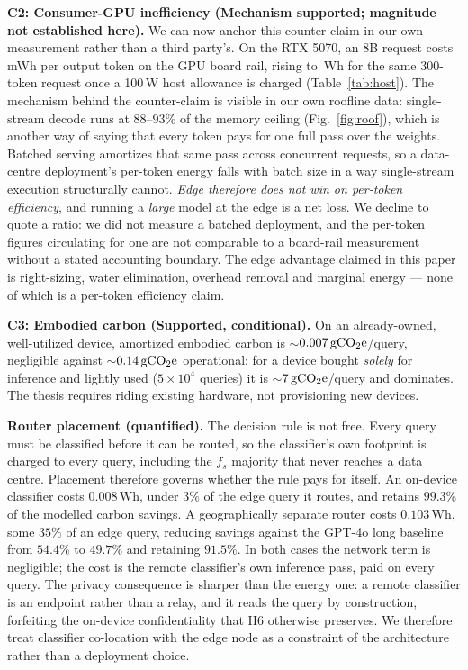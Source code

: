 \documentclass[conference]{IEEEtran}
\newcommand{\Wh}{\,\text{Wh}}
\newcommand{\gco}{\,\text{gCO\textsubscript{2}e}}
\newcommand{\fs}{f_{s}}
\begin{document}
\textbf{C2: Consumer-GPU inefficiency (Mechanism supported; magnitude not
established here).} We can now anchor this counter-claim in our own measurement
rather than a third party's. On the RTX 5070, an 8B request costs
\RtxEightMilliWh{}\,mWh per output token on the GPU board rail, rising to
\RtxEightHostHundred{}\,Wh for the same 300-token request once a 100\,W host
allowance is charged (Table~\ref{tab:host}). The mechanism behind the
counter-claim is visible in our own roofline data: single-stream decode runs at
$88$--$93\%$ of the memory ceiling (Fig.~\ref{fig:roof}), which is another way
of saying that every token pays for one full pass over the weights. Batched
serving amortizes that same pass across concurrent requests, so a data-centre
deployment's per-token energy falls with batch size in a way single-stream
execution structurally cannot. \emph{Edge therefore does not win on per-token
efficiency}, and running a \emph{large} model at the edge is a net loss. We
decline to quote a ratio: we did not measure a batched deployment, and the
per-token figures circulating for one are not comparable to a board-rail
measurement without a stated accounting boundary. The edge advantage claimed in
this paper is right-sizing, water elimination, overhead removal and marginal
energy --- none of which is a per-token efficiency claim.

\textbf{C3: Embodied carbon (Supported, conditional).} On an already-owned,
well-utilized device, amortized embodied carbon is $\sim$$0.007\gco$/query,
negligible against $\sim$$0.14\gco$ operational; for a device bought \emph{solely}
for inference and lightly used ($5{\times}10^4$ queries) it is $\sim$$7\gco$/query
and dominates. The thesis requires riding existing hardware, not provisioning new
devices.

\textbf{Router placement (quantified).} The decision rule is not free. Every
query must be classified before it can be routed, so the classifier's own
footprint is charged to every query, including the $\fs$ majority that never
reaches a data centre. Placement therefore governs whether the rule pays for
itself. An on-device classifier costs $0.008\Wh$, under $3\%$ of the edge query
it routes, and retains $99.3\%$ of the modelled carbon savings. A
geographically separate router costs $0.103\Wh$, some $35\%$ of an edge query,
reducing savings against the GPT-4o long baseline from $54.4\%$ to $49.7\%$ and
retaining $91.5\%$. In both cases the network term is negligible; the cost is
the remote classifier's own inference pass, paid on every query. The privacy
consequence is sharper than the energy one: a remote classifier is an endpoint
rather than a relay, and it reads the query by construction, forfeiting the
on-device confidentiality that H6 otherwise preserves. We therefore treat
classifier co-location with the edge node as a constraint of the architecture
rather than a deployment choice.
\end{document}
